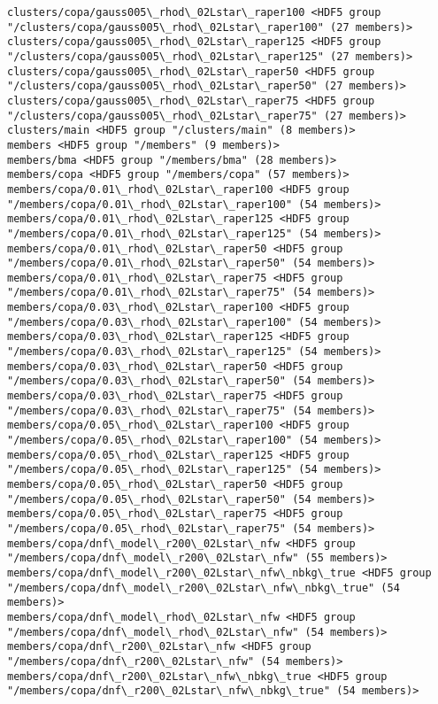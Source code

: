 \documentclass[11pt]{article}
\begin{document}
\begin{Verbatim}[commandchars=\\\{\}]
clusters/copa/gauss005\_rhod\_02Lstar\_raper100 <HDF5 group "/clusters/copa/gauss005\_rhod\_02Lstar\_raper100" (27 members)>
clusters/copa/gauss005\_rhod\_02Lstar\_raper125 <HDF5 group "/clusters/copa/gauss005\_rhod\_02Lstar\_raper125" (27 members)>
clusters/copa/gauss005\_rhod\_02Lstar\_raper50 <HDF5 group "/clusters/copa/gauss005\_rhod\_02Lstar\_raper50" (27 members)>
clusters/copa/gauss005\_rhod\_02Lstar\_raper75 <HDF5 group "/clusters/copa/gauss005\_rhod\_02Lstar\_raper75" (27 members)>
clusters/main <HDF5 group "/clusters/main" (8 members)>
members <HDF5 group "/members" (9 members)>
members/bma <HDF5 group "/members/bma" (28 members)>
members/copa <HDF5 group "/members/copa" (57 members)>
members/copa/0.01\_rhod\_02Lstar\_raper100 <HDF5 group "/members/copa/0.01\_rhod\_02Lstar\_raper100" (54 members)>
members/copa/0.01\_rhod\_02Lstar\_raper125 <HDF5 group "/members/copa/0.01\_rhod\_02Lstar\_raper125" (54 members)>
members/copa/0.01\_rhod\_02Lstar\_raper50 <HDF5 group "/members/copa/0.01\_rhod\_02Lstar\_raper50" (54 members)>
members/copa/0.01\_rhod\_02Lstar\_raper75 <HDF5 group "/members/copa/0.01\_rhod\_02Lstar\_raper75" (54 members)>
members/copa/0.03\_rhod\_02Lstar\_raper100 <HDF5 group "/members/copa/0.03\_rhod\_02Lstar\_raper100" (54 members)>
members/copa/0.03\_rhod\_02Lstar\_raper125 <HDF5 group "/members/copa/0.03\_rhod\_02Lstar\_raper125" (54 members)>
members/copa/0.03\_rhod\_02Lstar\_raper50 <HDF5 group "/members/copa/0.03\_rhod\_02Lstar\_raper50" (54 members)>
members/copa/0.03\_rhod\_02Lstar\_raper75 <HDF5 group "/members/copa/0.03\_rhod\_02Lstar\_raper75" (54 members)>
members/copa/0.05\_rhod\_02Lstar\_raper100 <HDF5 group "/members/copa/0.05\_rhod\_02Lstar\_raper100" (54 members)>
members/copa/0.05\_rhod\_02Lstar\_raper125 <HDF5 group "/members/copa/0.05\_rhod\_02Lstar\_raper125" (54 members)>
members/copa/0.05\_rhod\_02Lstar\_raper50 <HDF5 group "/members/copa/0.05\_rhod\_02Lstar\_raper50" (54 members)>
members/copa/0.05\_rhod\_02Lstar\_raper75 <HDF5 group "/members/copa/0.05\_rhod\_02Lstar\_raper75" (54 members)>
members/copa/dnf\_model\_r200\_02Lstar\_nfw <HDF5 group "/members/copa/dnf\_model\_r200\_02Lstar\_nfw" (55 members)>
members/copa/dnf\_model\_r200\_02Lstar\_nfw\_nbkg\_true <HDF5 group "/members/copa/dnf\_model\_r200\_02Lstar\_nfw\_nbkg\_true" (54 members)>
members/copa/dnf\_model\_rhod\_02Lstar\_nfw <HDF5 group "/members/copa/dnf\_model\_rhod\_02Lstar\_nfw" (54 members)>
members/copa/dnf\_r200\_02Lstar\_nfw <HDF5 group "/members/copa/dnf\_r200\_02Lstar\_nfw" (54 members)>
members/copa/dnf\_r200\_02Lstar\_nfw\_nbkg\_true <HDF5 group "/members/copa/dnf\_r200\_02Lstar\_nfw\_nbkg\_true" (54 members)>

\end{Verbatim}
\end{document}
